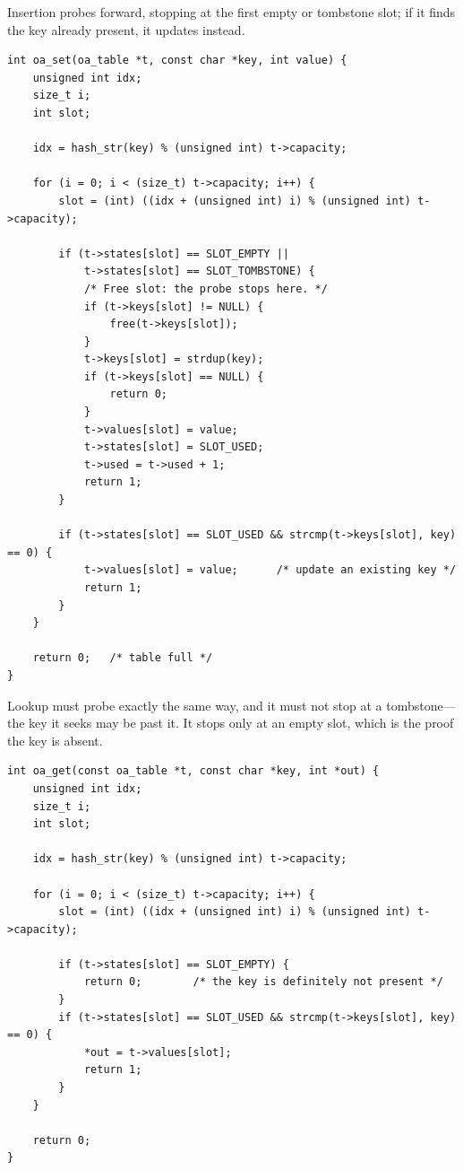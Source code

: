 Insertion probes forward, stopping at the first empty or tombstone
slot; if it finds the key already present, it updates instead.

\begin{lstlisting}[caption={Insert with linear probing. Returns 1 on success.}]
int oa_set(oa_table *t, const char *key, int value) {
    unsigned int idx;
    size_t i;
    int slot;

    idx = hash_str(key) % (unsigned int) t->capacity;

    for (i = 0; i < (size_t) t->capacity; i++) {
        slot = (int) ((idx + (unsigned int) i) % (unsigned int) t->capacity);

        if (t->states[slot] == SLOT_EMPTY ||
            t->states[slot] == SLOT_TOMBSTONE) {
            /* Free slot: the probe stops here. */
            if (t->keys[slot] != NULL) {
                free(t->keys[slot]);
            }
            t->keys[slot] = strdup(key);
            if (t->keys[slot] == NULL) {
                return 0;
            }
            t->values[slot] = value;
            t->states[slot] = SLOT_USED;
            t->used = t->used + 1;
            return 1;
        }

        if (t->states[slot] == SLOT_USED && strcmp(t->keys[slot], key) == 0) {
            t->values[slot] = value;      /* update an existing key */
            return 1;
        }
    }

    return 0;   /* table full */
}
\end{lstlisting}

Lookup must probe exactly the same way, and it must not stop at a
tombstone---the key it seeks may be past it. It stops only at an empty
slot, which is the proof the key is absent.

\begin{lstlisting}[caption={Lookup with the same probe sequence.}]
int oa_get(const oa_table *t, const char *key, int *out) {
    unsigned int idx;
    size_t i;
    int slot;

    idx = hash_str(key) % (unsigned int) t->capacity;

    for (i = 0; i < (size_t) t->capacity; i++) {
        slot = (int) ((idx + (unsigned int) i) % (unsigned int) t->capacity);

        if (t->states[slot] == SLOT_EMPTY) {
            return 0;        /* the key is definitely not present */
        }
        if (t->states[slot] == SLOT_USED && strcmp(t->keys[slot], key) == 0) {
            *out = t->values[slot];
            return 1;
        }
    }

    return 0;
}
\end{lstlisting}

